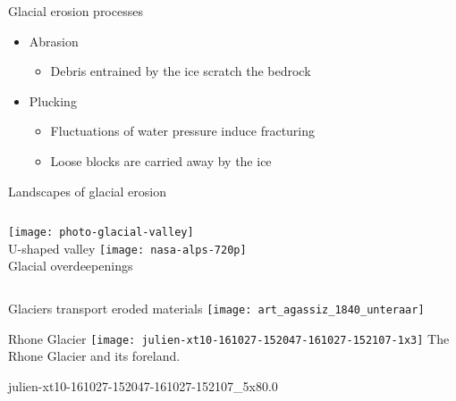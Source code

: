     \begin{frame}{Glacial erosion processes}
      \begin{itemize}
        \item Abrasion
          \begin{itemize}
            \item Debris entrained by the ice scratch the bedrock
          \end{itemize}
        \bigskip
        \item Plucking
          \begin{itemize}
            \item Fluctuations of water pressure induce fracturing
            \item Loose blocks are carried away by the ice
          \end{itemize}
      \end{itemize}
    \end{frame}

    \begin{frame}{Landscapes of glacial erosion}
      \begin{columns}
        \column{60mm}
          \texttt{[image: photo-glacial-valley]}\\
          U-shaped valley
        \column{60mm}
          \texttt{[image: nasa-alps-720p]}\\
          Glacial overdeepenings
      \end{columns}
    \end{frame}

    \begin{frame}{Glaciers transport eroded materials}
      \texttt{[image: art\_agassiz\_1840\_unteraar]}
    \end{frame}


    \begin{frame}{Rhone Glacier}
      \texttt{[image: julien-xt10-161027-152047-161027-152107-1x3]}
      The Rhone Glacier and its foreland.
    \end{frame}

    \begin{backgroundframe}[b]{julien-xt10-161027-152047-161027-152107_5x8}{0.0}{}
    \end{backgroundframe}

